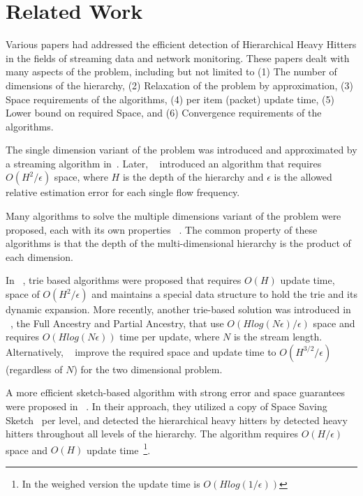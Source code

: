 \section{Related Work}
Various papers had addressed the efficient detection of Hierarchical Heavy Hitters in the fields of streaming data and network monitoring. These papers dealt with many aspects of the problem, including but not limited to (1) The number of dimensions of the hierarchy, (2) Relaxation of the problem by approximation, (3) Space requirements of the algorithms, (4) per item (packet) update time, (5) Lower bound on required Space, and (6) Convergence requirements of the algorithms.

The single dimension variant of the problem was introduced
and approximated by a streaming algorithm in~\cite{HHHInStreams}.
Later, ~\cite{separator} introduced an algorithm that requires $O(H^2/\epsilon)$ space, where $H$ is the depth of the hierarchy and $\epsilon$ is the allowed relative estimation error for each single flow frequency.

Many algorithms to solve the multiple dimensions variant of the problem were proposed, each with its own properties ~\cite{HHHOnline, SpaceSaving, HHHInStreams-MultiDimension, weightedCircuits, MultiDimensionHHH, lowerboundsonMultiDimension}. The common property of these algorithms is that the depth of the multi-dimensional hierarchy is the product of each dimension.

In ~\cite{HHHOnline}, trie based algorithms were proposed that requires $O(H)$ update time, space of $O(H^2/\epsilon)$ and  maintains a special data structure to hold the trie and its dynamic expansion. More recently, another trie-based solution was introduced in ~\cite{HHHInStreams-MultiDimension}, the Full Ancestry and Partial Ancestry, that use $O(Hlog(N\epsilon)/\epsilon)$ space and requires $O(Hlog(N\epsilon))$ time per update, where $N$ is the stream length. Alternatively, ~\cite{weightedCircuits} improve the required space and update time to $O(H^{3/2}/\epsilon)$ (regardless of $N$) for the two dimensional problem.

A more efficient sketch-based algorithm with strong error and space guarantees were proposed in ~\cite{SpaceSaving}. In their approach, they utilized a copy of Space Saving Sketch~\cite{metwally2005efficient} per level, and detected the hierarchical heavy hitters by detected heavy hitters throughout all levels of the hierarchy. The algorithm requires $O(H/\epsilon)$ space and $O(H)$ update time~\footnote{In the weighed version the update time is $O(Hlog(1/\epsilon))$}.

